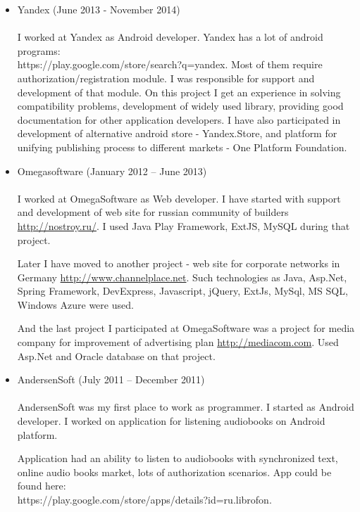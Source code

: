 \documentclass{article}
\begin{document}
\begin{itemize}
\item Yandex (June 2013 - November 2014) \\\\
I worked at Yandex as Android developer. Yandex has a lot of android programs: \\https://play.google.com/store/search?q=yandex. Most of them require authorization/registration module. I was responsible for support and development of that module. On this project I get an experience in solving compatibility problems, development of widely used library, providing good documentation for other application developers. I have also participated in development of alternative android store - Yandex.Store, and platform for unifying publishing process to different markets - One Platform Foundation.

\item Omegasoftware (January 2012 – June 2013) \\\\
I worked at OmegaSoftware as Web developer. I have started with support and development of web site for russian community of builders \url{http://nostroy.ru/}. I used Java Play Framework, ExtJS, MySQL during that project.

Later I have moved to another project - web site for corporate networks in Germany \url{http://www.channelplace.net}. Such technologies as Java, Asp.Net, Spring Framework, DevExpress, Javascript, jQuery, ExtJs, MySql, MS SQL, Windows Azure were used.

And the last project I participated at OmegaSoftware was a project for media company for improvement of advertising plan \url{http://mediacom.com}. Used Asp.Net and Oracle database on that project.
 
\item AndersenSoft (July 2011 – December 2011) \\\\
AndersenSoft was my first place to work as programmer. I started as Android developer. I worked on application for listening audiobooks on Android platform.

Application had an ability to listen to audiobooks with synchronized text, online audio books market, lots of authorization scenarios. App could be found here:\\https://play.google.com/store/apps/details?id=ru.librofon.
\end{itemize}
\end{document}
